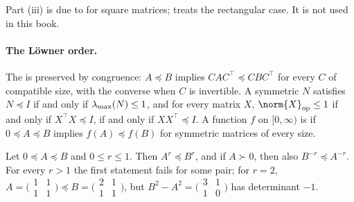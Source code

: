 \begin{refsection}
Part (iii) is due to \textcite{FanHoffman1955} for square matrices; \textcite[Chapter~8]{Higham2008} treats the rectangular case. It is not used in this book.

\paragraph{The L\"owner order.} The  is preserved by congruence: $A\preceq B$ implies $CAC^\top\preceq CBC^\top$ for every $C$ of compatible size, with the converse when $C$ is invertible. A symmetric $N$ satisfies $N\preceq I$ if and only if $\lambda_{\max}(N)\le1$, and for every matrix $X$, $\norm{X}_{\op}\le1$ if and only if $X^\top X\preceq I$, if and only if $XX^\top\preceq I$. A function $f$ on $[0,\infty)$ is  if $0\preceq A\preceq B$ implies $f(A)\preceq f(B)$ for symmetric matrices of every size.

\begin{theorem}\label{thm:toolkit:loewner}
Let $0\preceq A\preceq B$ and $0\le r\le1$. Then $A^r\preceq B^r$, and if $A\succ0$, then also $B^{-r}\preceq A^{-r}$. For every $r>1$ the first statement fails for some pair; for $r=2$, $A=\bigl(\begin{smallmatrix}1&1\\1&1\end{smallmatrix}\bigr)\preceq B=\bigl(\begin{smallmatrix}2&1\\1&1\end{smallmatrix}\bigr)$, but $B^2-A^2=\bigl(\begin{smallmatrix}3&1\\1&0\end{smallmatrix}\bigr)$ has determinant $-1$.
\end{theorem}


\end{refsection}

